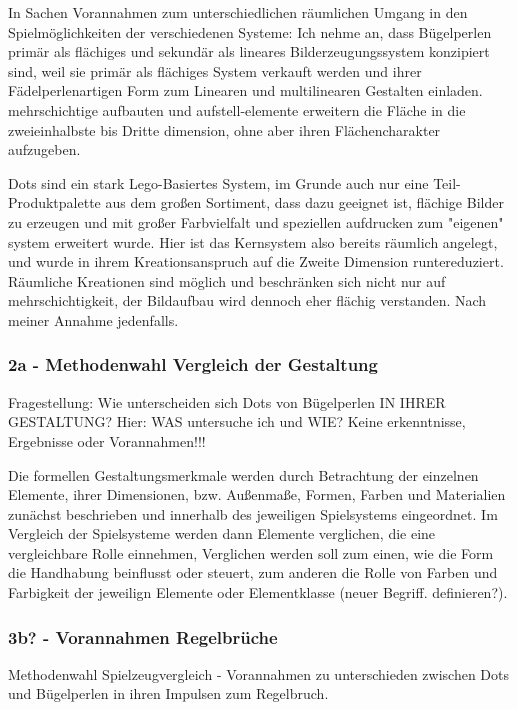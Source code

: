 \documentclass[11pt,a4paper,twoside]{scrreprt}
\begin{document}
In Sachen Vorannahmen zum unterschiedlichen räumlichen Umgang in den Spielmöglichkeiten der verschiedenen Systeme: 
Ich nehme an, dass Bügelperlen primär als flächiges und sekundär als lineares  Bilderzeugungssystem konzipiert sind, weil sie primär als flächiges System verkauft werden und ihrer Fädelperlenartigen Form zum Linearen und multilinearen Gestalten einladen. mehrschichtige aufbauten und aufstell-elemente erweitern die Fläche in die zweieinhalbste bis Dritte dimension, ohne aber ihren Flächencharakter aufzugeben. 

Dots sind ein stark Lego-Basiertes System, im Grunde auch nur eine Teil-Produktpalette aus dem großen Sortiment, dass dazu geeignet ist, flächige Bilder zu erzeugen und mit großer Farbvielfalt und speziellen aufdrucken zum "eigenen" system erweitert wurde. Hier ist das Kernsystem also bereits räumlich angelegt, und wurde in ihrem Kreationsanspruch auf die Zweite Dimension runtereduziert. Räumliche Kreationen sind möglich und beschränken sich nicht nur auf mehrschichtigkeit, der Bildaufbau wird dennoch eher flächig verstanden.  Nach meiner Annahme jedenfalls.	

				\subsubsection{2a - Methodenwahl Vergleich der Gestaltung}

Fragestellung: Wie unterscheiden sich Dots von Bügelperlen IN IHRER GESTALTUNG? 
Hier: WAS untersuche ich und WIE? Keine erkenntnisse, Ergebnisse oder Vorannahmen!!!

Die formellen Gestaltungsmerkmale werden durch Betrachtung der einzelnen Elemente, ihrer Dimensionen, bzw. Außenmaße, Formen, Farben und Materialien zunächst beschrieben und innerhalb des jeweiligen Spielsystems eingeordnet. Im Vergleich der Spielsysteme werden dann Elemente verglichen, die eine vergleichbare Rolle einnehmen, Verglichen werden soll zum einen, wie die Form die Handhabung beinflusst oder steuert, zum anderen die Rolle von Farben und Farbigkeit der jeweilign Elemente oder Elementklasse (neuer Begriff. definieren?).	

				\subsubsection{3b? - Vorannahmen Regelbrüche}

Methodenwahl Spielzeugvergleich - Vorannahmen zu unterschieden zwischen Dots und Bügelperlen in ihren Impulsen zum Regelbruch.
\end{document}
